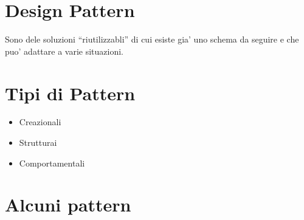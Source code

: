 \documentclass[\main/main.tex]{subfiles}
\begin{document}
\section{Design Pattern}
Sono dele soluzioni ``riutilizzabli'' di cui esiste gia' uno schema da seguire e che puo' adattare a varie situazioni.

\section{Tipi di Pattern}
\begin{itemize}
\item Creazionali
\item Strutturai
\item Comportamentali
\end{itemize}

\section{Alcuni pattern}
\end{document}
